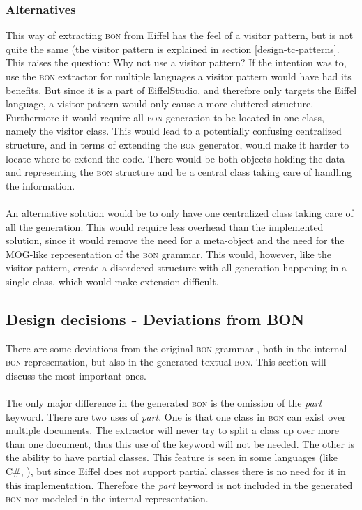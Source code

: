 \subsubsection{Alternatives}
This way of extracting \textsc{bon} from Eiffel has the feel of a visitor pattern, but is not quite the same (the visitor pattern is explained in section \ref{design-tc-patterns}. This raises the question: Why not use a visitor pattern? If the intention was to, use the \textsc{bon} extractor for multiple languages a visitor pattern would have had its benefits. But since it is a part of EiffelStudio, and therefore only targets the Eiffel language, a visitor pattern would only cause a more cluttered structure. Furthermore it would require all \textsc{bon} generation to be located in one class, namely the visitor class. This would lead to a potentially confusing centralized structure, and in terms of extending the \textsc{bon} generator, would make it harder to locate where to extend the code. There would be both objects holding the data and representing the \textsc{bon} structure and be a central class taking care of handling the information.
\paragraph{}
An alternative solution would be to only have one centralized class taking care of all the generation. This would require less overhead than the implemented solution, since it would remove the need for a meta-object and the need for the MOG-like representation of the \textsc{bon} grammar. This would, however, like the visitor pattern, create a disordered structure with all generation happening in a single class, which would make extension difficult.

\subsection{Design decisions - Deviations from BON}
\label{deviations_from_bon}There are some deviations from the original \textsc{bon} grammar \cite[pp.~352-359]{walden1995}, both in the internal \textsc{bon} representation, but also in the generated textual \textsc{bon}. This section will discuss the most important ones. 

\paragraph{}
\label{part}
The only major difference in the generated \textsc{bon} is the omission of the \textit{part} keyword. There are two uses of \textit{part}. One is that one class in \textsc{bon} can exist over multiple documents. The extractor will never try to split a class up over more than one document, thus this use of the keyword will not be needed. The other is the ability to have partial classes. This feature is seen in some languages (like C\#, \cite{msdn2009}), but since Eiffel does not support partial classes there is no need for it in this implementation. Therefore the \textit{part} keyword is not included in the generated \textsc{bon} nor modeled in the internal representation.

